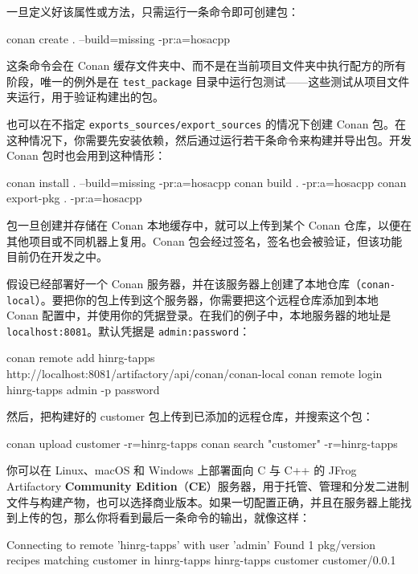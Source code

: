 一旦定义好该属性或方法，只需运行一条命令即可创建包：

\begin{codebox}[text]
conan create . --build=missing -pr:a=hosacpp
\end{codebox}

这条命令会在 Conan 缓存文件夹中、而不是在当前项目文件夹中执行配方的所有阶段，唯一的例外是在 \texttt{test\_\allowbreak{}package} 目录中运行包测试——这些测试从项目文件夹运行，用于验证构建出的包。

\label{idx:742}
也可以在不指定 \texttt{exports\_\allowbreak{}sources/\allowbreak{}export\_\allowbreak{}sources} 的情况下创建 Conan 包。在这种情况下，你需要先安装依赖，然后通过运行若干条命令来构建并导出包。开发 Conan 包时也会用到这种情形：

\begin{codebox}[text]
conan install . --build=missing -pr:a=hosacpp
conan build . -pr:a=hosacpp
conan export-pkg . -pr:a=hosacpp
\end{codebox}

\label{idx:743}
包一旦创建并存储在 Conan 本地缓存中，就可以上传到某个 Conan 仓库，以便在其他项目或不同机器上复用。Conan 包会经过签名，签名也会被验证，但该功能目前仍在开发之中。

假设已经部署好一个 Conan 服务器，并在该服务器上创建了本地仓库（\texttt{conan-local}）。要把你的包上传到这个服务器，你需要把这个远程仓库添加到本地 Conan 配置中，并使用你的凭据登录。在我们的例子中，本地服务器的地址是 \texttt{localhost:8081}。默认凭据是 \texttt{admin:password}：

\begin{codebox}[text]
conan remote add hinrg-tapps  http://localhost:8081/artifactory/api/conan/conan-local
conan remote login hinrg-tapps admin -p password
\end{codebox}

然后，把构建好的 customer 包上传到已添加的远程仓库，并搜索这个包：

\begin{codebox}[text]
conan upload customer -r=hinrg-tapps
conan search "customer" -r=hinrg-tapps
\end{codebox}

你可以在 Linux、macOS 和 Windows 上部署面向 C 与 C++ 的 JFrog Artifactory \textbf{Community Edition}（\textbf{CE}）服务器，用于托管、管理和分发二进制文件与构建产物，也可以选择商业版本。如果一切配置正确，并且在服务器上能找到上传的包，那么你将看到最后一条命令的输出，就像这样：

\begin{codebox}[text]
Connecting to remote 'hinrg-tapps' with user 'admin'
Found 1 pkg/version recipes matching customer in hinrg-tapps
hinrg-tapps
  customer
    customer/0.0.1
\end{codebox}

